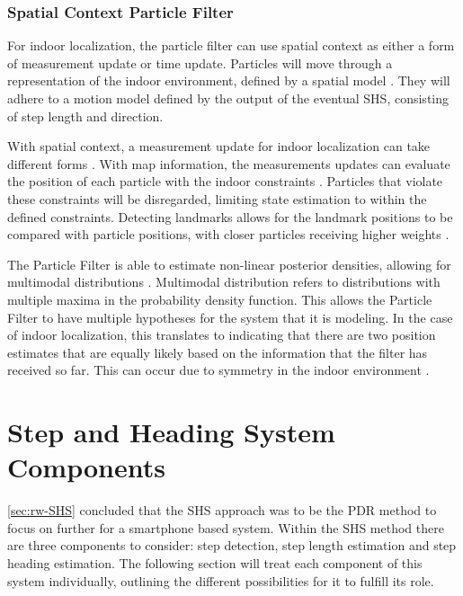 \subsubsection{Spatial Context Particle Filter}
For indoor localization, the particle filter can use spatial context as either a form of measurement update or time update. Particles will move through a representation of the indoor environment, defined by a spatial model \cite{kihlberg2012map, Qian2015}. They will adhere to a motion model defined by the output of the eventual \ac{SHS}, consisting of step length and direction.\par 

With spatial context, a measurement update for indoor localization can take different forms \cite{Gu2019}. With map information, the measurements updates can evaluate the position of each particle with the indoor constraints \cite{Qian2015}. Particles that violate these constraints will be disregarded, limiting state estimation to within the defined constraints. Detecting landmarks allows for the landmark positions to be compared with particle positions, with closer particles receiving higher weights \cite{Shang2015}.  \par 

The Particle Filter is able to estimate non-linear posterior densities, allowing for multimodal distributions \cite{gustafsson2010particle,kihlberg2012map}. Multimodal distribution refers to distributions with multiple maxima in the probability density function. This allows the Particle Filter to have multiple hypotheses for the system that it is modeling. In the case of indoor localization, this translates to indicating that there are two position estimates that are equally likely based on the information that the filter has received so far. This can occur due to symmetry in the indoor environment  \cite{Woodman2008}.


\newpage
\section{Step and Heading System Components}
\label{sec:shs_components}

\cref{sec:rw-SHS} concluded that the \acl{SHS} approach was to be the \ac{PDR} method to focus on further for a smartphone based system. Within the \ac{SHS} method there are three components to consider: step detection, step length estimation and step heading estimation. The following section will treat each component of this system individually, outlining the different possibilities for it to fulfill its role. \par 

